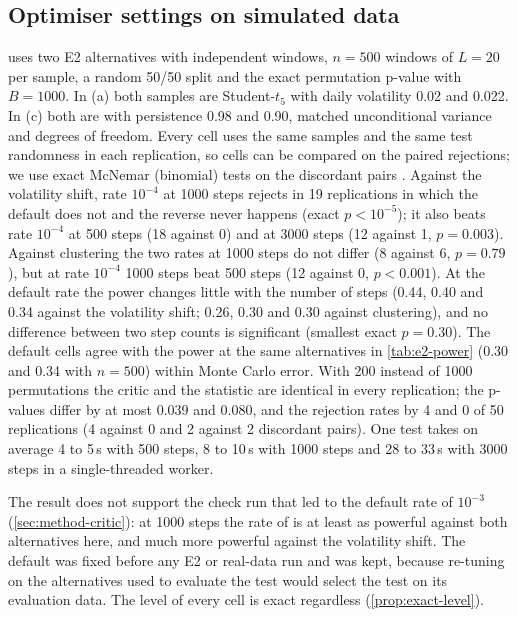 \subsection{Optimiser settings on simulated data}

 uses two E2 alternatives with independent windows, $n=500$ windows of $L=20$
per sample, a random 50/50 split and the exact permutation p-value with $B=1000$. In (a) both
samples are Student-$t_5$ with daily volatility 0.02 and 0.022. In (c) both are \GARCHt{} with
persistence 0.98 and 0.90, matched unconditional variance and degrees of freedom. Every cell uses
the same samples and the same test randomness in each replication, so cells can be compared on
the paired rejections; we use exact McNemar (binomial) tests on the discordant pairs
\citep{mcnemar_1947_note}. Against the volatility shift, rate $10^{-4}$ at 1000 steps rejects in
19 replications in which the default does not and the reverse never happens (exact
$p<10^{-5}$); it also beats rate $10^{-4}$ at 500 steps (18 against 0) and at 3000 steps (12
against 1, $p=0.003$). Against clustering the two rates at 1000 steps do not differ (8 against
6, $p=0.79$), but at rate $10^{-4}$ 1000 steps beat 500 steps (12 against 0, $p<0.001$). At the
default rate the power changes little with the number of steps (0.44, 0.40 and 0.34 against the
volatility shift; 0.26, 0.30 and 0.30 against clustering), and no difference between two step
counts is significant (smallest exact $p=0.30$). The default cells agree with the \WC{} power at
the same alternatives in \cref{tab:e2-power} (0.30 and 0.34 with $n=500$) within Monte Carlo
error. With 200 instead of 1000 permutations the critic and the statistic are identical in every
replication; the p-values differ by at most 0.039 and 0.080, and the rejection rates by 4 and 0
of 50 replications (4 against 0 and 2 against 2 discordant pairs). One test takes on average 4
to 5\,s with 500 steps, 8 to 10\,s with 1000 steps and 28 to 33\,s with 3000 steps in a
single-threaded worker.

The result does not support the check run that led to the default rate of $10^{-3}$
(\cref{sec:method-critic}): at 1000 steps the rate of \citet{gulrajani2017improved} is at least as
powerful against both alternatives here, and much more powerful against the volatility shift. The
default was fixed before any E2 or real-data run and was kept, because re-tuning on the
alternatives used to evaluate the test would select the test on its evaluation data. The level of
every cell is exact regardless (\cref{prop:exact-level}).

